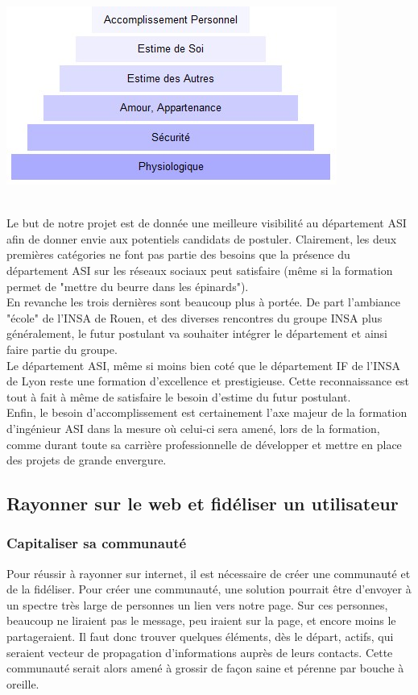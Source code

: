 \begin{center}
\includegraphics[scale=0.5]{./image/pyramidemaslow.jpg}
\end{center}
~~\\
\indent Le but de notre projet est de donnée une meilleure visibilité au département ASI afin de donner envie aux potentiels candidats de postuler. Clairement, les deux premières catégories ne font pas partie des besoins que la présence du département ASI sur les réseaux sociaux peut satisfaire (même si la formation permet de "mettre du beurre dans les épinards"). ~~\\
\indent En revanche les trois dernières sont beaucoup plus à portée. 
\indent De part l'ambiance "école" de l'INSA de Rouen, et des diverses rencontres du groupe INSA plus généralement, le futur postulant va souhaiter intégrer le département et ainsi faire partie du groupe. ~~\\
\indent Le département ASI, même si moins bien coté que le département IF de l'INSA de Lyon reste une formation d'excellence et prestigieuse. Cette reconnaissance est tout à fait à même de satisfaire le besoin d'estime du futur postulant. ~~\\
\indent Enfin, le besoin d'accomplissement est certainement l'axe majeur de la formation d'ingénieur ASI dans la mesure où celui-ci sera amené, lors de la formation, comme durant toute sa carrière professionnelle de développer et mettre en place des projets de grande envergure.

\subsection{Rayonner sur le web et fidéliser un utilisateur}
\subsubsection{Capitaliser sa communauté}
Pour réussir à rayonner sur internet, il est nécessaire de créer une communauté et de la fidéliser. Pour créer une communauté, une solution pourrait être d'envoyer à un spectre très large de personnes un lien vers notre page. Sur ces personnes, beaucoup ne liraient pas le message, peu iraient sur la page, et encore moins le partageraient. Il faut donc trouver quelques éléments, dès le départ, actifs, qui seraient vecteur de propagation d'informations auprès de leurs contacts. Cette communauté serait alors amené à grossir de façon saine et pérenne par bouche à oreille.
